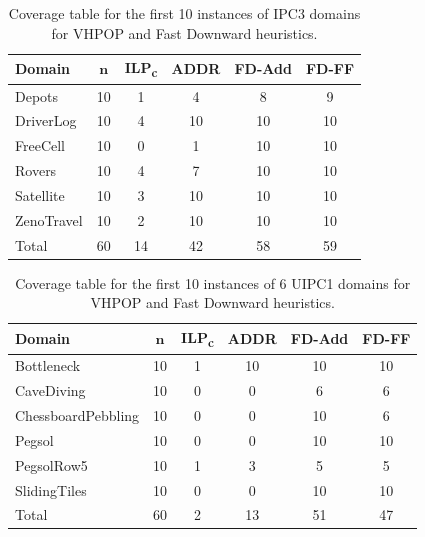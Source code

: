 \begin{table}[h]
    \centering
    \begin{tabular}{lccccc}
        \hline
        \textbf{Domain} & $\mathbf{n}$ & \textbf{ILP\textsubscript{c}} & \textbf{ADDR} & \textbf{FD-Add} & \textbf{FD-FF} \\ 
        \hline
        Depots & 10 & 1 & 4 & 8 & 9 \\ 
        DriverLog & 10 & 4 & 10 & 10 & 10 \\ 
        FreeCell & 10 & 0 & 1 & 10 & 10 \\ 
        Rovers & 10 & 4 & 7 & 10 & 10 \\ 
        Satellite & 10 & 3 & 10 & 10 & 10 \\ 
        ZenoTravel & 10 & 2 & 10 & 10 & 10 \\ 
        \hline
        Total & 60 & 14 & 42 & 58 & 59 \\ 
        \hline
    \end{tabular}
    \caption{Coverage table for the first 10 instances of IPC3 domains for VHPOP and Fast Downward heuristics.}
    \label{fig:solvableCoverage}
\end{table}


\begin{table}[h]
    \centering
    \begin{tabular}{lccccc}
        \hline
        \textbf{Domain} & $\mathbf{n}$ & \textbf{ILP\textsubscript{c}} & \textbf{ADDR} & \textbf{FD-Add} & \textbf{FD-FF} \\ 
        \hline
        Bottleneck & 10 & 1 & 10 & 10 & 10 \\ 
        CaveDiving & 10 & 0 & 0 & 6 & 6 \\ 
        ChessboardPebbling & 10 & 0 & 0 & 10 & 6 \\ 
        Pegsol & 10 & 0 & 0 & 10 & 10 \\ 
        PegsolRow5 & 10 & 1 & 3 & 5 & 5 \\ 
        SlidingTiles & 10 & 0 & 0 & 10 & 10 \\ 
        \hline
        Total & 60 & 2 & 13 & 51 & 47 \\ 
        \hline
    \end{tabular}
    \caption{Coverage table for the first 10 instances of 6 UIPC1 domains for VHPOP and Fast Downward heuristics.}
    \label{fig:unsolvableCoverage}
\end{table}


